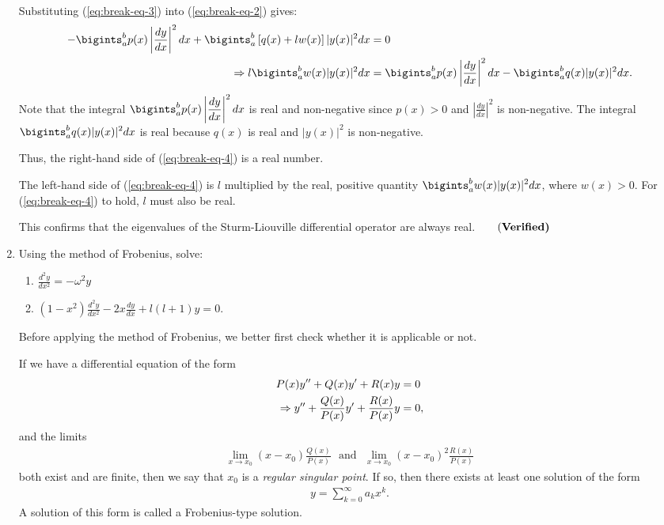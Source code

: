 \begin{enumerate}[label={(\arabic*)}]
\begin{align}
    \end{align}
    Substituting (\ref{eq:break-eq-3}) into (\ref{eq:break-eq-2}) gives:
    \begin{align}
        -\bigints_a^b p(x) \left| \frac{dy}{dx} \right|^2 dx + \bigints_a^b \left[ q(x) + l w(x) \right] |y(x)|^2 dx &= 0\notag\\
        \Rightarrow l \bigints_a^b w(x) |y(x)|^2 dx &= \bigints_a^b p(x) \left| \frac{dy}{dx} \right|^2 dx - \bigints_a^b q(x) |y(x)|^2 dx. \label{eq:break-eq-4}
    \end{align}
    Note that the integral $\displaystyle\bigints_a^b p(x) \left| \frac{dy}{dx} \right|^2 dx $ is real and non-negative since $ p(x) > 0 $ and $\displaystyle\left| \frac{dy}{dx} \right|^2 $ is non-negative. The integral $\displaystyle\bigints_a^b q(x) |y(x)|^2 dx $ is real because $ q(x) $ is real and $ |y(x)|^2 $ is non-negative.
    
    Thus, the right-hand side of (\ref{eq:break-eq-4}) is a real number.

    The left-hand side of (\ref{eq:break-eq-4}) is $ l $ multiplied by the real, positive quantity $\displaystyle\bigints_a^b w(x) |y(x)|^2 dx $, where $ w(x) > 0 $. For (\ref{eq:break-eq-4}) to hold, $ l $ must also be real.

    This confirms that the eigenvalues of the Sturm-Liouville differential operator are always real.$\qquad\text{(\bf Verified)}$
    \bigskip\bigskip\hline\hline\bigskip
    \item Using the method of Frobenius, solve:
    \begin{enumerate}[label={(\alph*)}]
        \item $\displaystyle\frac{d^2y}{dx^2}=-\omega^2y$
        \item $\displaystyle\left(1 - x^2\right) \frac{d^2 y}{dx^2} - 2x \frac{dy}{dx} + l (l + 1) y = 0$.
    \end{enumerate}
    \bigskip\bigskip\hline\hline\bigskip
    Before applying the method of Frobenius, we better first check whether it is applicable or not.
    
    If we have a differential equation of the form
    \begin{align}
        P(x)y^{\prime\prime}+Q(x)y^{\prime}+R(x)y&=0\label{eq:frobenius-preferred-diff-eqs}\\
        \Rightarrow y^{\prime\prime}+\frac{Q(x)}{P(x)}y^{\prime}+\frac{R(x)}{P(x)}y&=0,\notag
    \end{align}
    and the limits 
    \begin{align*}
        \lim_{x\to x_0}(x-x_0)\frac{Q(x)}{P(x)}~~~\text{and}~~~\lim_{x\to x_0}(x-x_0)^2\frac{R(x)}{P(x)}
    \end{align*}
    both exist and are finite, then we say that $x_0$ is a \textit{regular singular point}. If so, then there exists at least one solution of the form
    \begin{align*}
        y=\sum_{k=0}^\infty a_kx^k.
    \end{align*}
    A solution of this form is called a Frobenius-type solution.


\end{enumerate}
